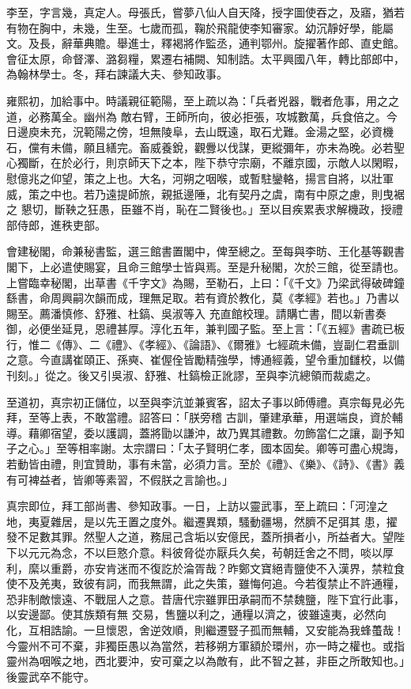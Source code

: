 \begin{pinyinscope}
 李至，字言幾，真定人。母張氏，嘗夢八仙人自天降，授字圖使吞之，及寤，猶若有物在胸中，未幾，生至。七歲而孤，鞠於飛龍使李知審家。幼沉靜好學，能屬文。及長，辭華典贍。舉進士，釋褐將作監丞，通判鄂州。旋擢著作郎、直史館。會征太原，命督澤、潞芻糧，累遷右補闕、知制誥。太平興國八年，轉比部郎中，為翰林學士。冬，拜右諫議大夫、參知政事。



 雍熙初，加給事中。時議親征範陽，至上疏以為：「兵者兇器，戰者危事，用之之道，必務萬全。幽州為
 敵右臂，王師所向，彼必拒張，攻城數萬，兵食倍之。今日邊庾未充，況範陽之傍，坦無陵阜，去山既遠，取石尤難。金湯之堅，必資機石，儻有未備，願且繕完。畜威養銳，觀釁以伐謀，更縱彌年，亦未為晚。必若聖心獨斷，在於必行，則京師天下之本，陛下恭守宗廟，不離京國，示敵人以閑暇，慰億兆之仰望，策之上也。大名，河朔之咽喉，或暫駐鑾輅，揚言自將，以壯軍威，策之中也。若乃遠提師旅，親抵邊陲，北有契丹之虞，南有中原之慮，則曳裾之
 懇切，斷鞅之狂愚，臣雖不肖，恥在二賢後也。」至以目疾累表求解機政，授禮部侍郎，進秩吏部。



 會建秘閣，命兼秘書監，選三館書置閣中，俾至總之。至每與李昉、王化基等觀書閣下，上必遣使賜宴，且命三館學士皆與焉。至是升秘閣，次於三館，從至請也。上嘗臨幸秘閣，出草書《千字文》為賜，至勒石，上曰：「《千文》乃梁武得破碑鐘繇書，命周興嗣次韻而成，理無足取。若有資於教化，莫《孝經》若也。」乃書以賜至。薦潘慎修、舒雅、杜鎬、吳淑等入
 充直館校理。請購亡書，間以新書奏御，必便坐延見，恩禮甚厚。淳化五年，兼判國子監。至上言：「《五經》書疏已板行，惟二《傳》、二《禮》、《孝經》、《論語》、《爾雅》七經疏未備，豈副仁君垂訓之意。今直講崔頤正、孫奭、崔偓佺皆勵精強學，博通經義，望令重加讎校，以備刊刻。」從之。後又引吳淑、舒雅、杜鎬檢正訛謬，至與李沆總領而裁處之。



 至道初，真宗初正儲位，以至與李沆並兼賓客，詔太子事以師傅禮。真宗每見必先拜，至等上表，不敢當禮。詔答曰：「朕旁稽
 古訓，肇建承華，用選端良，資於輔導。藉卿宿望，委以護調，蓋將勖以謙沖，故乃異其禮數。勿飾當仁之讓，副予知子之心。」至等相率謝。太宗謂曰：「太子賢明仁孝，國本固矣。卿等可盡心規誨，若動皆由禮，則宜贊助，事有未當，必須力言。至於《禮》、《樂》、《詩》、《書》義有可裨益者，皆卿等素習，不假朕之言諭也。」



 真宗即位，拜工部尚書、參知政事。一日，上訪以靈武事，至上疏曰：「河湟之地，夷夏雜居，是以先王置之度外。繼遷異類，騷動疆埸，然臍不足弭其
 患，擢發不足數其罪。然聖人之道，務屈己含垢以安億民，蓋所損者小，所益者大。望陛下以元元為念，不以巨憝介意。料彼脅從亦厭兵久矣，茍朝廷舍之不問，啖以厚利，縻以重爵，亦安肯迷而不復訖於淪胥哉？昨鄭文寶絕青鹽使不入漢界，禁粒食使不及羌夷，致彼有詞，而我無謂，此之失策，雖悔何追。今若復禁止不許通糧，恐非制敵懷遠、不戰屈人之意。昔唐代宗雖罪田承嗣而不禁魏鹽，陛下宜行此事，以安邊鄙。使其族類有無
 交易，售鹽以利之，通糧以濟之，彼雖遠夷，必然向化，互相誥諭。一旦懷恩，舍逆效順，則繼遷豎子孤而無輔，又安能為我蜂蠆哉！今靈州不可不棄，非獨臣愚以為當然，若移朔方軍額於環州，亦一時之權也。或指靈州為咽喉之地，西北要沖，安可棄之以為敵有，此不智之甚，非臣之所敢知也。」後靈武卒不能守。




\end{pinyinscope}

